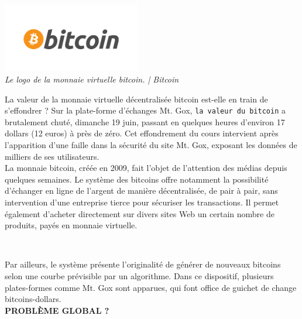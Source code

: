 \documentclass[11pt,twoside,a4paper]{article}
\begin{document}
\begin{minipage}[ht]{6.25cm}	
	\includegraphics[width=6.00cm]{img/1537310_3_ab4d_le-logo-de-la-monnaie-virtuelle-bitcoin.png} ~\\
	\emph{Le logo de la monnaie virtuelle bitcoin. | Bitcoin}
\end{minipage} \hfill \begin{minipage}[ht]{12.50cm}
	La valeur de la monnaie virtuelle d{\'e}centralis{\'e}e bitcoin est-elle en train de s'effondrer ? Sur la plate-forme d'{\'e}changes Mt. Gox, \texttt{la valeur du bitcoin\footnotemark} a brutalement chut{\'e}, dimanche 19 juin, passant en quelques heures d'environ 17 dollars (12 euros) {\`a} pr{\`e}s de z{\'e}ro. Cet effondrement du cours intervient apr{\`e}s l'apparition d'une faille dans la s{\'e}curit{\'e} du site Mt. Gox, exposant les donn{\'e}es de milliers de ses utilisateurs. ~\\
	
	La monnaie bitcoin, cr{\'e}{\'e}e en 2009, fait l'objet de l'attention des m{\'e}dias depuis quelques semaines. Le syst{\`e}me des bitcoins offre notamment la possibilit{\'e} d'{\'e}changer en ligne de l'argent de mani{\`e}re d{\'e}centralis{\'e}e, de pair {\`a} pair, sans intervention d'une entreprise tierce pour s{\'e}curiser les transactions. Il permet {\'e}galement d'acheter directement sur divers sites Web un certain nombre de produits, pay{\'e}s en monnaie virtuelle. ~\\
\end{minipage}~\\

Par ailleurs, le syst{\`e}me pr{\'e}sente l'originalit{\'e} de g{\'e}n{\'e}rer de nouveaux bitcoins selon une courbe pr{\'e}visible par un algorithme. Dans ce dispositif, plusieurs plates-formes comme Mt. Gox sont apparues, qui font office de guichet de change bitcoins-dollars. ~\\

\textbf{\textsc{PROBL{\`E}ME GLOBAL ?}}~\\
\end{document}
